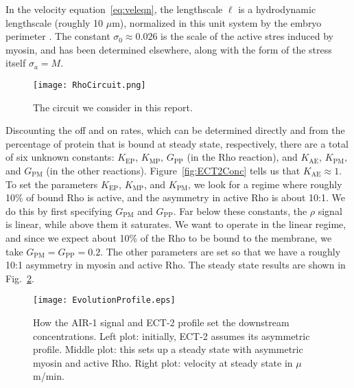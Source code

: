\documentclass[11pt]{article}
\begin{document}
In the velocity equation\ \eqref{eq:veleqn}, the lengthscale $\ell$ is a hydrodynamic lengthscale (roughly 10 $\mu$m), normalized in this unit system by the embryo perimeter \cite{saha2016determining}. The constant $\sigma_0  \approx 0.026$ is the scale of the active stres induced by myosin, and has been determined elsewhere, along with the form of the stress itself $\sigma_a = M$. 

\begin{figure}
\centering
\texttt{[image: RhoCircuit.png]}
\caption{\label{fig:RhoCirc}The circuit we consider in this report.}
\end{figure}

Discounting the off and on rates, which can be determined directly and from the percentage of protein that is bound at steady state, respectively, there are a total of six unknown constants: $K_\text{EP}$, $K_\text{MP}$, $G_\text{PP}$ (in the Rho reaction), and $K_\text{AE}$, $K_\text{PM}$, and $G_\text{PM}$ (in the other reactions). Figure\ \ref{fig:ECT2Conc} tells us that $K_\text{AE} \approx 1$. To set the parameters $K_\text{EP}$, $K_\text{MP}$, and $K_\text{PM}$, we look for a regime where roughly 10\% of bound Rho is active, and the asymmetry in active Rho is about 10:1. We do this by first specifying $G_\text{PM}$ and $G_\text{PP}$. Far below these constants, the $\rho$ signal is linear, while above them it saturates. We want to operate in the linear regime, and since we expect about 10\% of the Rho to be bound to the membrane, we take $G_\text{PM}=G_\text{PP}=0.2$. The other parameters are set so that we have a roughly 10:1 asymmetry in myosin and active Rho. The steady state results are shown in Fig.\ \ref{fig:RhoEv}.  

\begin{figure}
\centering
\texttt{[image: EvolutionProfile.eps]}
\caption{\label{fig:RhoEv}How the AIR-1 signal and ECT-2 profile set the downstream concentrations. Left plot: initially, ECT-2 assumes its asymmetric profile. Middle plot: this sets up a steady state with asymmetric myosin and active Rho. Right plot: velocity at steady state in $\mu$m/min.}
\end{figure}


\iffalse
\end{document}
